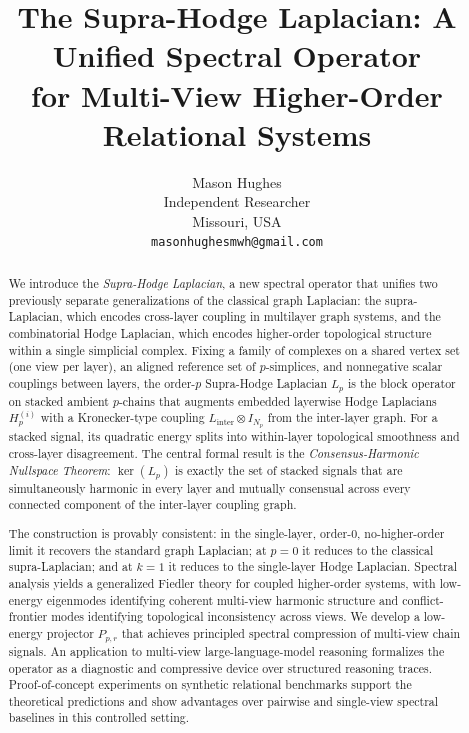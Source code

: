 \documentclass[11pt]{article}
\title{The Supra-Hodge Laplacian: A Unified Spectral Operator\\
       for Multi-View Higher-Order Relational Systems}
\author{Mason Hughes\\[4pt]
        Independent Researcher\\
        Missouri, USA\\
        \texttt{masonhughesmwh@gmail.com}}
\date{}
\theoremstyle{definition}
\theoremstyle{remark}
\begin{document}
\maketitle

\begin{abstract}
We introduce the \emph{Supra-Hodge Laplacian}, a new spectral operator that
unifies two previously separate generalizations of the classical graph
Laplacian: the supra-Laplacian, which encodes cross-layer coupling in
multilayer graph systems, and the combinatorial Hodge Laplacian, which encodes
higher-order topological structure within a single simplicial complex. Fixing a
family of complexes on a shared vertex set (one view per layer), an aligned
reference set of $p$-simplices, and nonnegative scalar couplings between layers,
the order-$p$ Supra-Hodge Laplacian $L_p$ is the block operator on stacked
ambient $p$-chains that augments embedded layerwise Hodge Laplacians
$H_p^{(i)}$ with a Kronecker-type coupling $L_{\mathrm{inter}}\otimes I_{N_p}$
from the inter-layer graph. For a stacked signal, its quadratic energy splits
into within-layer topological smoothness and cross-layer disagreement. The
central formal result is the
\emph{Consensus-Harmonic Nullspace Theorem}: $\ker(L_p)$ is exactly the set of
stacked signals that are simultaneously harmonic in every layer and mutually
consensual across every connected component of the inter-layer coupling graph.

The construction is provably consistent: in the single-layer, order-$0$,
no-higher-order limit it recovers the standard graph Laplacian; at $p=0$ it
reduces to the classical supra-Laplacian; and at $k=1$ it reduces to the
single-layer Hodge Laplacian. Spectral analysis yields a
generalized Fiedler theory for coupled higher-order systems, with low-energy
eigenmodes identifying coherent multi-view harmonic structure and
conflict-frontier modes identifying topological inconsistency across views. We
develop a low-energy projector $P_{p,r}$ that achieves principled spectral
compression of multi-view chain signals. An application to multi-view
large-language-model reasoning formalizes the operator as a diagnostic and
compressive device over structured reasoning traces.
Proof-of-concept experiments on synthetic relational benchmarks support the
theoretical predictions and show advantages over pairwise and single-view
spectral baselines in this controlled setting.
\end{abstract}
\end{document}
